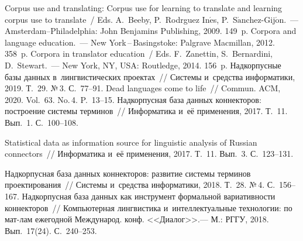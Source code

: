\begin{multicols}{2}
{{\begin{thebibliography}{99}
Corpus use and translating: Corpus use for learning to translate and learning corpus use to 
translate~/ Eds. A.~Beeby, P.~\mbox{Rodr{\!\ptb{\'{\i}}}guez} In$\acute{\mbox{e}}$s, 
P.~S$\acute{\mbox{a}}$nchez-Gij$\acute{\mbox{o}}$n.~--- Amsterdam--Philadelphia: John 
Benjamins Publishing, 2009. 149~p.
 Corpora and language education.~--- New York\,--\,Basingstoke: Palgrave Macmillan, 
2012. 358~p.
Corpora in translator education~/ Eds. F.~Zanettin, S.~Bernardini, D.~Stewart.~--- New York, NY, 
USA: Routledge, 2014. 156~p.
 Надкорпусные базы данных 
в~лингвистических проектах~// Системы и~средства информатики, 2019. 
Т.~29. №\,3. С.~77--91.
 Dead languages come to life~// Commun. ACM, 2020. Vol.~63. 
No.\,4. P.~13--15.
 Надкорпусная база данных 
коннекторов: построение системы терминов~// Информатика и~её применения, 2017. Т.~11. 
Вып.~1. С.~100--108.

 Statistical data as information source for linguistic analysis of Russian 
connectors~// Информатика и~её применения, 2017. Т.~11. Вып.~3. С.~123--131.

 Надкорпусная база данных коннекторов: развитие 
системы терминов проектирования~// Системы и~средства информатики, 2018. Т.~28. №\,4. 
С.~156--167.
 Надкорпусная база данных как инструмент формальной вариативности 
коннекторов~// Компьютерная лингвистика и~интеллектуальные технологии: по мат-лам 
ежегодной Международ. конф. <<Диалог>>.--- М.: РГГУ, 2018. Вып.~17(24). С.~240--253.


\end{thebibliography}}}
\end{multicols}
